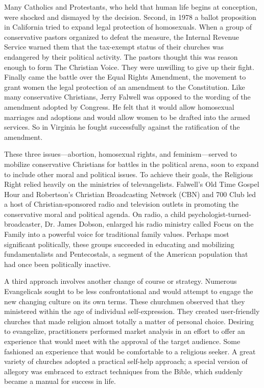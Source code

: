 Many Catholics and Protestants, who held that human life begins at conception, were shocked and
dismayed by the decision. Second, in 1978 a ballot proposition in California tried to expand legal
protection of homosexuals. When a group of conservative pastors organized to defeat the measure, the
Internal Revenue Service warned them that the tax-exempt status of their churches was endangered by
their political activity. The pastors thought this was reason enough to form The Christian Voice.
They were unwilling to give up their fight. Finally came the battle over the Equal Rights Amendment,
the movement to grant women the legal protection of an amendment to the Constitution. Like many
conservative Christians, Jerry Falwell was opposed to the wording of the amendment adopted by
Congress. He felt that it would allow homosexual marriages and adoptions and would allow women to be
drafted into the armed services. So in Virginia he fought successfully against the ratification of
the amendment.

These three issues—abortion, homosexual rights, and feminism—served to mobilize conservative
Christians for battles in the political arena, soon to expand to include other moral and political
issues. To achieve their goals, the Religious Right relied heavily on the ministries of
televangelists. Falwell’s Old Time Gospel Hour and Robertson’s Christian Broadcasting Network (CBN)
and 700 Club led a host of Christian-sponsored radio and television outlets in promoting the
conservative moral and political agenda. On radio, a child psychologist-turned-broadcaster, Dr.
James Dobson, enlarged his radio ministry called Focus on the Family into a powerful voice for
traditional family values. Perhaps most significant politically, these groups succeeded in educating
and mobilizing fundamentalists and Pentecostals, a segment of the American population that had once
been politically inactive.

A third approach involves another change of course or strategy. Numerous Evangelicals sought to be
less confrontational and would attempt to engage the new changing culture on its own terms. These
churchmen observed that they ministered within the age of individual self-expression. They created
user-friendly churches that made religion almost totally a matter of personal choice. Desiring to
evangelize, practitioners performed market analysis in an effort to offer an experience that would
meet with the approval of the target audience. Some fashioned an experience that would be
comfortable to a religious seeker. A great variety of churches adopted a practical self-help
approach; a special version of allegory was embraced to extract techniques from the Bible, which
suddenly became a manual for success in life.

